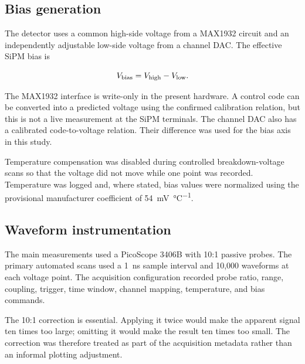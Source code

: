 \subsection{Bias generation}

The detector uses a common high-side voltage from a MAX1932 circuit and an independently adjustable low-side voltage from a channel DAC. The effective SiPM bias is

\begin{equation}
  V_{\mathrm{bias}} = V_{\mathrm{high}}-V_{\mathrm{low}}.
  \label{eq:effective-bias}
\end{equation}

The MAX1932 interface is write-only in the present hardware. A control code can be converted into a predicted voltage using the confirmed calibration relation, but this is not a live measurement at the SiPM terminals. The channel DAC also has a calibrated code-to-voltage relation. Their difference was used for the bias axis in this study.

Temperature compensation was disabled during controlled breakdown-voltage scans so that the voltage did not move while one point was recorded. Temperature was logged and, where stated, bias values were normalized using the provisional manufacturer coefficient of \SI{54}{\milli\volt\per\degreeCelsius}.

\subsection{Waveform instrumentation}

The main measurements used a PicoScope 3406B with 10:1 passive probes. The primary automated scans used a \SI{1}{\nano\second} sample interval and 10,000 waveforms at each voltage point. The acquisition configuration recorded probe ratio, range, coupling, trigger, time window, channel mapping, temperature, and bias commands.

The 10:1 correction is essential. Applying it twice would make the apparent signal ten times too large; omitting it would make the result ten times too small. The correction was therefore treated as part of the acquisition metadata rather than an informal plotting adjustment.
